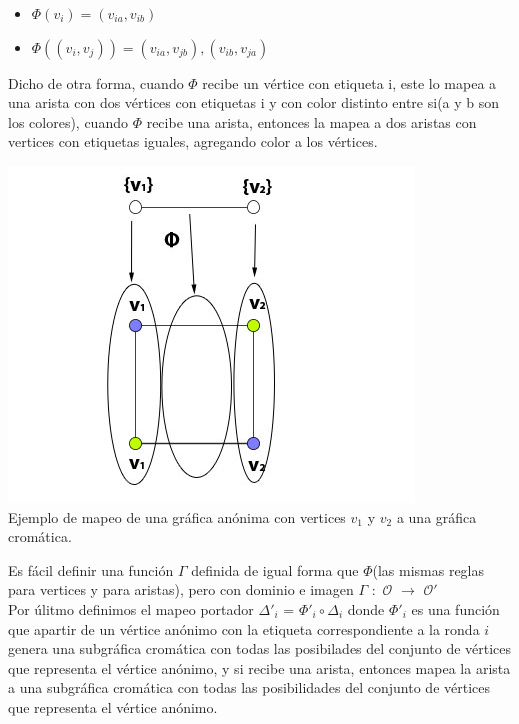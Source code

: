 \documentclass{article}
\begin{document}
\begin{enumerate}
{    \begin{itemize}
      \item{
          $\Phi(v_i) = (v_{ia},v_{ib})$
        }
         \item{
             $\Phi((v_i,v_j)) = (v_{ia},v_{jb}), (v_{ib},v_{ja})$
        }
    \end{itemize}

    Dicho de otra forma, cuando $\Phi$ recibe un vértice con etiqueta i, este lo mapea a una arista con dos vértices
    con etiquetas i y con color distinto entre si(a y b son los colores), cuando $\Phi$ recibe una arista, entonces la 
    mapea a dos aristas con vertices con etiquetas iguales, agregando color a los vértices.

    \begin{center}
      \includegraphics[scale=0.6]{5_input.jpg}
      \\Ejemplo de mapeo de una gráfica anónima con vertices $v_1$ y $v_2$ a una gráfica cromática.
    \end{center}

    Es fácil definir una función $\Gamma$ definida de igual forma que $\Phi$(las mismas reglas para vertices y para aristas),
    pero con dominio e imagen
    $\Gamma$ $:$ $\mathcal{O}$ $\xrightarrow{}$ $\mathcal{O}'$\\
    Por úlitmo definimos el mapeo portador $\Delta'_i$ = $\Phi'_i \circ \Delta_i$ donde $\Phi'_i$ es una función que apartir de un vértice
    anónimo con la etiqueta correspondiente a la ronda $i$ genera una subgráfica cromática con todas las posibilades del conjunto de
    vértices que representa el vértice anónimo, y si recibe una arista, entonces mapea la arista a una subgráfica cromática con todas 
    las posibilidades del conjunto de vértices que representa el vértice anónimo.

}
\end{enumerate}
\end{document}
